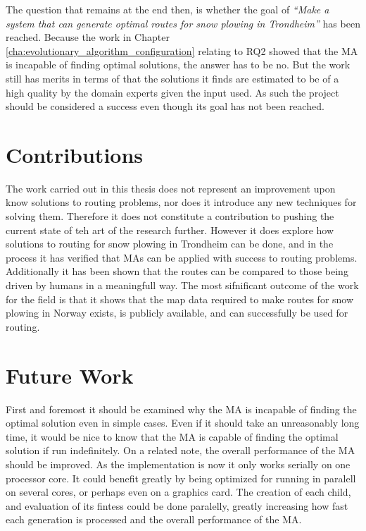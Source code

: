 The question that remains at the end then, is whether the goal of \emph{\enquote{Make a system that can generate optimal routes for snow plowing in Trondheim}} has been reached. Because the work in Chapter \ref{cha:evolutionary_algorithm_configuration} relating to RQ2 showed that the MA is incapable of finding optimal solutions, the answer has to be no. But the work still has merits in terms of that the solutions it finds are estimated to be of a high quality by the domain experts given the input used. As such the project should be considered a success even though its goal has not been reached.





\section{Contributions}

The work carried out in this thesis does not represent an improvement upon know solutions to routing problems, nor does it introduce any new techniques for solving them. Therefore it does not constitute a contribution to pushing the current state of teh art of the research further. However it does explore how solutions to routing for snow plowing in Trondheim can be done, and in the process it has verified that MAs can be applied with success to routing problems. Additionally it has been shown that the routes can be compared to those being driven by humans in a meaningfull way. The most sifnificant outcome of the work for the field is that it shows that the map data required to make routes for snow plowing in Norway exists, is publicly available, and can successfully be used for routing.

\section{Future Work}

First and foremost it should be examined why the MA is incapable of finding the optimal solution even in simple cases. Even if it should take an unreasonably long time, it would be nice to know that the MA is capable of finding the optimal solution if run indefinitely. On a related note, the overall performance of the MA should be improved. As the implementation is now it only works serially on one processor core. It could benefit greatly by being optimized for running in paralell on several cores, or perhaps even on a graphics card. The creation of each child, and evaluation of its fintess could be done paralelly, greatly increasing how fast each generation is processed and the overall performance of the MA.

